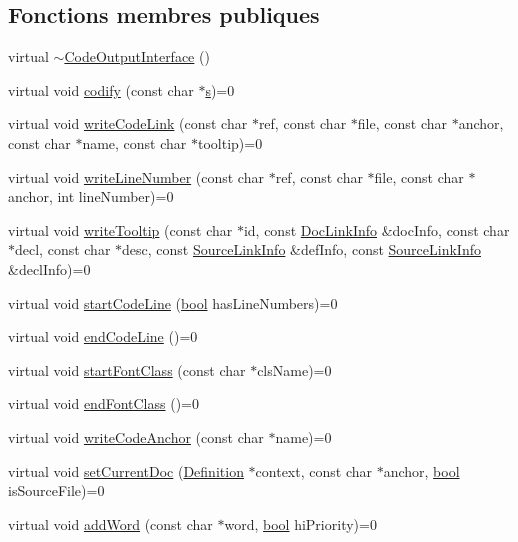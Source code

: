 \subsection*{Fonctions membres publiques}
\begin{DoxyCompactItemize}
\item 
virtual \hyperlink{class_code_output_interface_a09fd2fd0be98227359200de7ab89c7e6}{$\sim$\+Code\+Output\+Interface} ()
\item 
virtual void \hyperlink{class_code_output_interface_aa29a5eedda08596ace50ed5b59c8ae7f}{codify} (const char $\ast$\hyperlink{060__command__switch_8tcl_a011c73f2dbb87635a3b4206c72355f6e}{s})=0
\item 
virtual void \hyperlink{class_code_output_interface_a102e2b7f40916c75b79871307f5bb674}{write\+Code\+Link} (const char $\ast$ref, const char $\ast$file, const char $\ast$anchor, const char $\ast$name, const char $\ast$tooltip)=0
\item 
virtual void \hyperlink{class_code_output_interface_a8115646785b65e292480c2e4e969b389}{write\+Line\+Number} (const char $\ast$ref, const char $\ast$file, const char $\ast$anchor, int line\+Number)=0
\item 
virtual void \hyperlink{class_code_output_interface_a4326ca642f6ec228466ae310622f73ad}{write\+Tooltip} (const char $\ast$id, const \hyperlink{struct_doc_link_info}{Doc\+Link\+Info} \&doc\+Info, const char $\ast$decl, const char $\ast$desc, const \hyperlink{struct_source_link_info}{Source\+Link\+Info} \&def\+Info, const \hyperlink{struct_source_link_info}{Source\+Link\+Info} \&decl\+Info)=0
\item 
virtual void \hyperlink{class_code_output_interface_a080d71d457de084ce2b3245bca5a0d68}{start\+Code\+Line} (\hyperlink{qglobal_8h_a1062901a7428fdd9c7f180f5e01ea056}{bool} has\+Line\+Numbers)=0
\item 
virtual void \hyperlink{class_code_output_interface_afac5763eafc78f93b82691fb9a6dcff7}{end\+Code\+Line} ()=0
\item 
virtual void \hyperlink{class_code_output_interface_ac90f75968cdcf127e0b02938bdb49d87}{start\+Font\+Class} (const char $\ast$cls\+Name)=0
\item 
virtual void \hyperlink{class_code_output_interface_a2b8ac05a391dae36793aa3aa8714a0f6}{end\+Font\+Class} ()=0
\item 
virtual void \hyperlink{class_code_output_interface_a1f6394c4ef7c4143de90bcaf3a65c0b4}{write\+Code\+Anchor} (const char $\ast$name)=0
\item 
virtual void \hyperlink{class_code_output_interface_a67a190860748597bd65b4cfc313797d3}{set\+Current\+Doc} (\hyperlink{class_definition}{Definition} $\ast$context, const char $\ast$anchor, \hyperlink{qglobal_8h_a1062901a7428fdd9c7f180f5e01ea056}{bool} is\+Source\+File)=0
\item 
virtual void \hyperlink{class_code_output_interface_a2734a8371d6e710620ad238ed8de118e}{add\+Word} (const char $\ast$word, \hyperlink{qglobal_8h_a1062901a7428fdd9c7f180f5e01ea056}{bool} hi\+Priority)=0
\end{DoxyCompactItemize}


